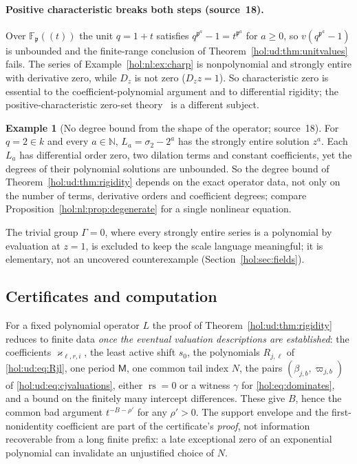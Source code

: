 \documentclass[11pt]{article}
\numberwithin{equation}{section}
\theoremstyle{definition}
\newtheorem{example}[theorem]{Example}
\theoremstyle{remark}
\newcommand{\N}{\mathbb N}
\begin{document}
\paragraph{Positive characteristic breaks both steps (source~18).}
Over $\mathbb F_{\mathfrak p}((t))$ the unit $q=1+t$ satisfies
$q^{\mathfrak p^a}-1=t^{\mathfrak p^a}$ for $a\ge0$, so $v(q^{\mathfrak p^a}-1)$ is
unbounded and the finite-range conclusion of
Theorem~\ref{hol:ud:thm:unitvalues} fails. The series of
Example~\ref{hol:nl:ex:charp} is nonpolynomial and strongly entire with
derivative zero, while $D_z$ is not zero ($D_zz=1$). So characteristic zero is
essential to the coefficient-polynomial argument and to differential
rigidity; the positive-characteristic zero-set theory~\cite{derksen} is a
different subject.

\begin{example}[No degree bound from the shape of the operator; source~18]
\label{hol:ud:ex:degree}
For $q=2\in k$ and every $a\in\N$, $L_a=\sigma_2-2^a$ has the strongly entire
solution $z^a$. Each $L_a$ has differential order zero, two dilation terms and
constant coefficients, yet the degrees of their polynomial solutions are
unbounded. So the degree bound of Theorem~\ref{hol:ud:thm:rigidity} depends on
the exact operator data, not only on the number of terms, derivative orders
and coefficient degrees; compare Proposition~\ref{hol:nl:prop:degenerate} for
a single nonlinear equation.
\end{example}

The trivial group $\Gamma=0$, where every strongly entire series is a
polynomial by evaluation at $z=1$, is excluded to keep the scale language
meaningful; it is elementary, not an uncovered counterexample
(Section~\ref{hol:sec:fields}).

\subsection{Certificates and computation}\label{hol:ud:sub:certificates}

For a fixed polynomial operator $L$ the proof of
Theorem~\ref{hol:ud:thm:rigidity} reduces to finite data \emph{once the
eventual valuation descriptions are established}: the coefficients
$\varkappa_{\ell,r,i}$, the least active shift $s_0$, the polynomials
$R_{j,\ell}$ of \eqref{hol:ud:eq:Rjl}, one period $\mathsf M$, one common tail
index $N$, the pairs $(\beta_{j,b},\varpi_{j,b})$ of
\eqref{hol:ud:eq:cjvaluations}, either $\operatorname{rs}=0$ or a witness
$\gamma$ for \eqref{hol:eq:dominates}, and a bound on the finitely many
intercept differences. These give $B$, hence the common bad argument
$t^{-B-\rho'}$ for any $\rho'>0$. The support envelope and the
first-nonidentity coefficient are part of the certificate's \emph{proof}, not
information recoverable from a long finite prefix: a late exceptional zero of
an exponential polynomial can invalidate an unjustified choice of $N$.
\end{document}
